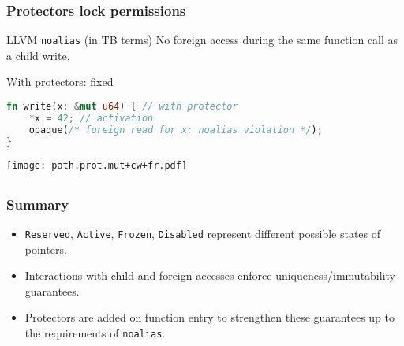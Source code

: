 \begin{frame}[fragile]
    \frametitle{Protectors lock permissions}
    \begin{alertblock}{LLVM \texttt{noalias} (in TB terms)}
        No foreign access during the same function call as a child write.
    \end{alertblock}

    \begin{block}{With protectors: fixed}
        \begin{lstlisting}[language=rust, escapechar=@]
fn write(x: &mut u64) { // with protector
    *x = 42; // activation
    opaque(/* foreign read for x: noalias violation */);
}
        \end{lstlisting}
    \end{block}
    \texttt{[image: path.prot.mut+cw+fr.pdf]}
\end{frame}



\subsection*{}

\begin{frame}
    \frametitle{Summary}
    \begin{itemize}
        \item \texttt{Reserved}, \texttt{Active}, \texttt{Frozen}, \texttt{Disabled}
            represent different possible states of pointers.\\
        \item Interactions with child and foreign accesses enforce uniqueness/immutability guarantees.
        \item Protectors are added on function entry to strengthen these guarantees up to the
            requirements of \texttt{noalias}.\\
    \end{itemize}
\end{frame}
